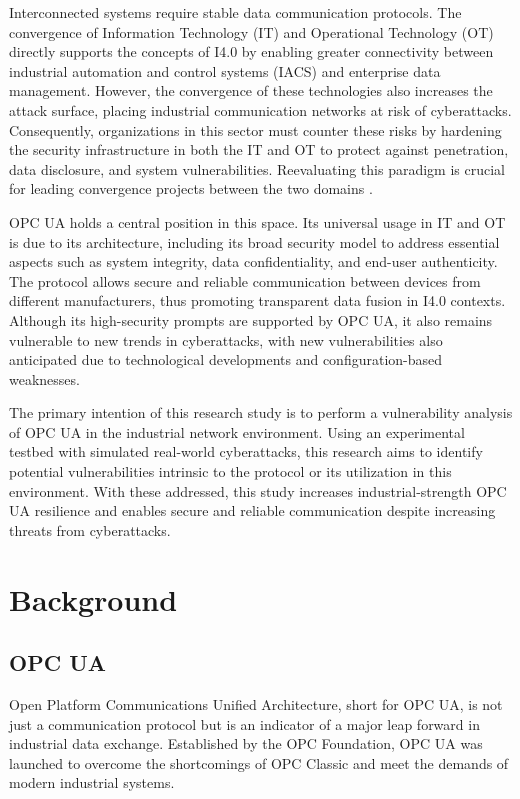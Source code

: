 \documentclass[pdflatex,sn-mathphys-num,iicol]{sn-jnl}%
\begin{document}
Interconnected systems require stable data communication protocols. The convergence of Information Technology (IT) and Operational Technology (OT) directly supports the concepts of I4.0 by enabling greater connectivity between industrial automation and control systems (IACS) and enterprise data management. However, the convergence of these technologies also increases the attack surface, placing industrial communication networks at risk of cyberattacks. Consequently,  organizations in this sector must counter these risks by hardening the security infrastructure in both the IT and OT to protect against penetration, data disclosure, and system vulnerabilities. Reevaluating this paradigm is crucial for leading convergence projects between the two domains \cite{yassine2021}.

OPC UA holds a central position in this space. Its universal usage in IT and OT is due to its architecture, including its broad security model to address essential aspects such as system integrity, data confidentiality, and end-user authenticity. The protocol allows secure and reliable communication between devices from different manufacturers, thus promoting transparent data fusion in I4.0 contexts. Although its high-security prompts are supported by OPC UA, it also remains vulnerable to new trends in cyberattacks, with new vulnerabilities also anticipated due to technological developments and configuration-based weaknesses.

The primary intention of this research study is to perform a vulnerability analysis of OPC UA in the industrial network environment. Using an experimental testbed with simulated real-world cyberattacks, this research aims to identify potential vulnerabilities intrinsic to the protocol or its utilization in this environment. %
With these addressed, this study increases industrial-strength OPC UA resilience and enables secure and reliable communication despite increasing threats from cyberattacks.

\section{Background}
\subsection{OPC UA} \label{sec:opc_ua_iacs}

Open Platform Communications Unified Architecture, short for OPC UA, is not just a communication protocol but is an indicator of a major leap forward in industrial data exchange. Established by the OPC Foundation, OPC UA was launched to overcome the shortcomings of OPC Classic and meet the demands of modern industrial systems.
\end{document}
